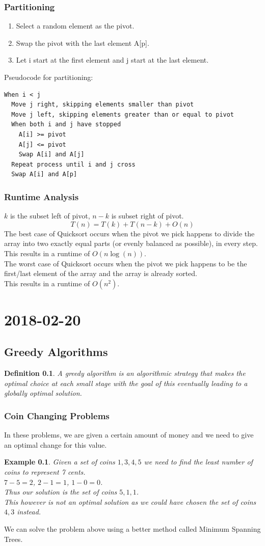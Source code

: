 \documentclass{report}
\newtheorem*{ex}{Example}
\newtheorem*{defn}{Definition}
\newcommand{\mychapter}[2]{
	\setcounter{chapter}{#1}
	\setcounter{section}{0}
	\chapter*{#2}
	\addcontentsline{toc}{chapter}{#2}
}
\begin{document}
\subsection{Partitioning}
\begin{enumerate}
\item Select a random element as the pivot.
\item Swap the pivot with the last element A[p].
\item Let i start at the first element and j start at the last element.
\end{enumerate}
Pseudocode for partitioning:
\begin{verbatim}
When i < j
  Move j right, skipping elements smaller than pivot
  Move j left, skipping elements greater than or equal to pivot
  When both i and j have stopped
    A[i] >= pivot
    A[j] <= pivot
    Swap A[i] and A[j]
  Repeat process until i and j cross
  Swap A[i] and A[p]
\end{verbatim}

\subsection{Runtime Analysis}
$k$ is the subset left of pivot, $n-k$ is subset right of pivot.
\[ T(n) = T(k) + T(n-k) + O(n) \]
The best case of Quicksort occurs when the pivot we pick happens to divide the array into two exactly equal parts (or evenly balanced as possible), in every step.\\
This results in a runtime of $O(n\log(n))$.\\
The worst case of Quicksort occurs when the pivot we pick happens to be the first/last element of the array and the array is already sorted.\\
This results in a runtime of $O(n^2)$.\\


\mychapter{5}{2018-02-20}
\section{Greedy Algorithms}
\begin{defn}
A greedy algorithm is an algorithmic strategy that makes the optimal choice at each small stage with the goal of this eventually leading to a globally optimal solution.
\end{defn}

\subsection{Coin Changing Problems}
In these problems, we are given a certain amount of money and we need to give an optimal change for this value.
\begin{ex}
Given a set of coins ${1,3,4,5}$ we need to find the least number of coins to represent 7 cents.\\
$7-5 = 2$, $2-1 = 1$, $1-0 = 0$.\\
Thus our solution is the set of coins ${5,1,1}$.\\
This however is not an optimal solution as we could have chosen the set of coins ${4,3}$ instead.
\end{ex}
We can solve the problem above using a better method called Minimum Spanning Trees.
\end{document}
